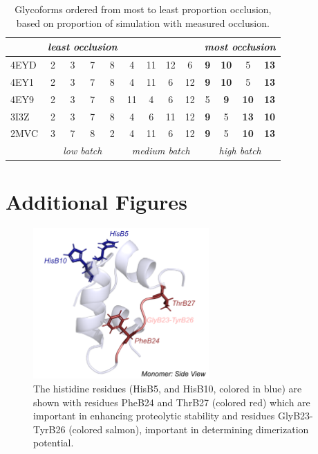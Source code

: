 \documentclass[9pt]{elife}
\begin{document}
\renewcommand{\thetable}{S\arabic{table}}
\begin{table}[ht]
\centering
\begin{tabular} {|l| c c c c c c c c c c c c|}
    \hline
     & \multicolumn{4}{c}{\textit{least occlusion}} &&& & & \multicolumn{4}{c|}{\textit{most occlusion}}\\
    \hline     
    4EYD&2&3&7&8&4&11&12&6&\textbf{9}&\textbf{10}&5&\textbf{13}\\
    4EY1&2&3&7&8&4&11&6&12&\textbf{9}&\textbf{10}&5&\textbf{13}\\
    4EY9&2&3&7&8&11&4&6&12&5&\textbf{9}&\textbf{10}&\textbf{13}\\
    3I3Z&2&3&7&8&4&6&11&12&\textbf{9}&5&\textbf{13}&\textbf{10}\\
    2MVC&3&7&8&2&4&11&6&12&\textbf{9}&5&\textbf{10}&\textbf{13}\\
    \hline
    & \multicolumn{4}{c|}{\textit{low batch}} & \multicolumn{4}{c|}{\textit{medium batch}} & \multicolumn{4}{c|}{\textit{high batch}}\\
    \hline
\end{tabular}
\caption{Glycoforms ordered from most to least proportion occlusion, based on proportion of simulation with measured occlusion.}
\label{supple_tab: occlusion_tab}
\end{table}

\section{Additional Figures}
\renewcommand{\thefigure}{S\arabic{figure}}
\begin{figure}[H]
\centering
\includegraphics[width=0.6\textwidth]{Figures/Fig_histidine_WT.png}
\caption{The histidine residues (HisB5, and HisB10, colored in blue) are shown with residues PheB24 and ThrB27 (colored red) which are important in enhancing proteolytic stability and residues GlyB23-TyrB26 (colored salmon), important in determining dimerization potential.}
\label{supple_fig: WT_hist}
\end{figure}
\end{document}
